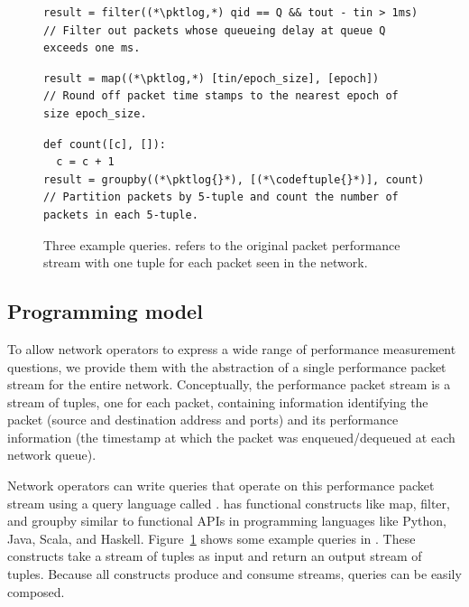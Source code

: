 \begin{figure}
\begin{minipage}[!h]{\textwidth}
\centering
\begin{lstlisting}
result = filter((*\pktlog,*) qid == Q && tout - tin > 1ms)
// Filter out packets whose queueing delay at queue Q exceeds one ms.
\end{lstlisting}
\end{minipage}

\begin{minipage}[!h]{\textwidth}
\centering
\begin{lstlisting}
result = map((*\pktlog,*) [tin/epoch_size], [epoch])
// Round off packet time stamps to the nearest epoch of size epoch_size.
\end{lstlisting}
\end{minipage}

\begin{minipage}[!h]{\textwidth}
\begin{lstlisting}
def count([c], []):
  c = c + 1
result = groupby((*\pktlog{}*), [(*\codeftuple{}*)], count)
// Partition packets by 5-tuple and count the number of packets in each 5-tuple.
\end{lstlisting}
\end{minipage}
\caption{Three example \TheSystem queries. {\ct \pktlog{}} refers to the
original packet performance stream with one tuple for each packet seen in the
network.}
\label{fig:example_queries}
\end{figure}

\subsection{Programming model} To allow network operators to express a wide
range of performance measurement questions, we provide them with the
abstraction of a single performance packet stream for the entire network.
Conceptually, the performance packet stream is a stream of tuples, one for each
packet, containing information identifying the packet (source and destination
address and ports) and its performance information (the timestamp at which the
packet was enqueued/dequeued at each network queue).

Network operators can write queries that operate on this performance packet
stream using a query language called \TheSystem. \TheSystem has functional
constructs like {\ct map}, {\ct filter}, and {\ct groupby} similar to
functional APIs in programming languages like Python, Java, Scala, and Haskell.
Figure~\ref{fig:example_queries} shows some example queries in \TheSystem.
These constructs take a stream of tuples as input and return an output stream
of tuples. Because all constructs produce and consume streams, \TheSystem
queries can be easily composed.

